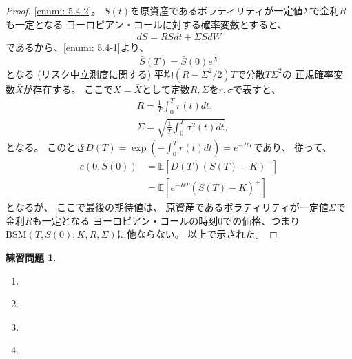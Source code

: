 \documentclass[uplatex]{jsarticle}
\theoremstyle{definition}
\newtheorem{prob}[prob]{練習問題}
\def\E{\mathbb{E}}
\begin{document}
\begin{proof}
  \ref{enumi: 5.4-2}。
  \(\bar{S}(t)\)を原資産であるボラティリティが一定値\(\Sigma\)で金利\(R\)も一定となる
  ヨーロピアン・コールに対する確率変数とすると、
  \[d\bar{S} = R\bar{S}dt + \Sigma\bar{S}dW\]
  であるから、\ref{enumi: 5.4-1}より、
  \[
  \bar{S}(T) = \bar{S}(0)e^{\bar{X}}
  \]
  となる (リスク中立測度に関する)
  平均\((R-\Sigma^2/2)T\)で分散\(T\Sigma^2\)の
  正規確率変数\(\bar{X}\)が存在する。
  ここで\(X=\bar{X}\)として定数\(R,\Sigma\)を\(r,\sigma\)で表すと、
  \begin{align*}
    &R = \frac{1}{T}\int_0^T r(t) dt, \\
    &\Sigma = \sqrt{\frac{1}{T}\int_0^T\sigma^2(t)dt},
  \end{align*}
  となる。
  このとき\(D(T) = \exp \left( -\int_0^T r(t) dt\right) = e^{-RT}\)であり、
  従って、
  \begin{align*}
    c(0,S(0)) &= \E \left[D(T)\left( S(T)-K \right)^+ \right]\\
    &= \E \left[ e^{-RT}\left( \bar{S}(T)-K \right)^+ \right]
  \end{align*}
  となるが、
  ここで最後の期待値は、
  原資産であるボラティリティが一定値\(\Sigma\)で金利\(R\)も一定となる
  ヨーロピアン・コールの時刻\(0\)での価格、つまり
  \(\mathrm{BSM}(T,S(0);K,R,\Sigma)\)に他ならない。
  以上で示された。
\end{proof}










\begin{prob}\label{prob: 5.5}
  \begin{enumerate}
    \item \label{enumi: 5.5-1}
    \item \label{enumi: 5.5-2}
    \item \label{enumi: 5.5-3}
    \item \label{enumi: 5.5-4}
  \end{enumerate}
\end{prob}
\end{document}
